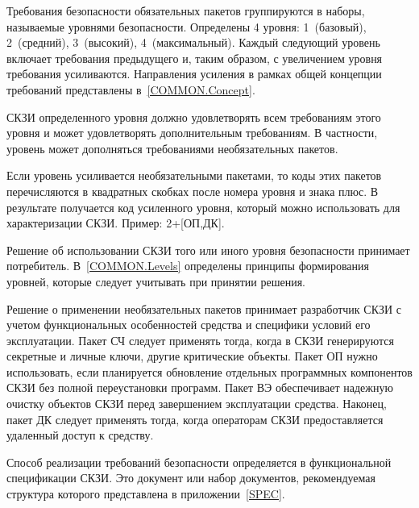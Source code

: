 Требования безопасности обязательных пакетов группируются в наборы, называемые 
уровнями безопасности. 
%
Определены 4 уровня: 1~(базовый), 2~(средний), 3~(высокий), 4~(максимальный).
%
Каждый следующий уровень включает требования предыдущего и, таким образом,
с увеличением уровня требования усиливаются.
%
Направления усиления в рамках общей концепции требований представлены 
в~\ref{COMMON.Concept}.

СКЗИ определенного уровня должно удовлетворять всем требованиям этого уровня
и может удовлетворять дополнительным требованиям.
%
В частности, уровень может дополняться требованиями необязательных пакетов.

Если уровень усиливается необязательными пакетами, то коды этих пакетов 
перечисляются в квадратных скобках после номера уровня и знака плюс. 
В результате получается код усиленного уровня, который можно использовать 
для характеризации СКЗИ. Пример: 2+[ОП,ДК].

Решение об использовании СКЗИ того или иного уровня безопасности принимает 
потребитель. В~\ref{COMMON.Levels} определены принципы формирования уровней, 
которые следует учитывать при принятии решения.

Решение о применении необязательных пакетов принимает разработчик СКЗИ с учетом 
функциональных особенностей средства и специфики условий его эксплуатации. 
%
Пакет СЧ следует применять тогда, когда в СКЗИ генерируются секретные и личные 
ключи, другие критические объекты.
%
Пакет ОП нужно использовать, если планируется обновление отдельных программных 
компонентов СКЗИ без полной переустановки программ.  
%
Пакет ВЭ обеспечивает надежную очистку объектов СКЗИ перед завершением 
эксплуатации средства.
%
Наконец, пакет ДК следует применять тогда, когда операторам СКЗИ 
предоставляется удаленный доступ к средству.

Способ реализации требований безопасности определяется
в функциональной спецификации СКЗИ. Это документ или набор документов,
рекомендуемая структура которого представлена в приложении~\ref{SPEC}.
